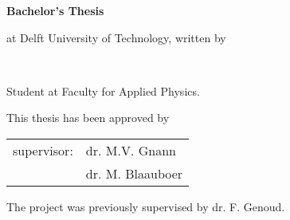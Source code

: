 \begin{titlepage}

\begin{center}


\vspace*{2\bigskipamount}

{\makeatletter
\titlestyle\bfseries\LARGE\@title
\makeatother}

{\makeatletter
\ifx\@subtitle\undefined\else
    \bigskip
    \titlefont\titleshape\Large\@subtitle
\fi
\makeatother}

\vfill

{\Large\titlefont\bfseries Bachelor's Thesis}

\bigskip
\bigskip

at Delft University of Technology, written by

\bigskip
\bigskip


\makeatletter
{\Large\titlefont\bfseries\@firstname\ {\titleshape\@lastname}}
\makeatother

\bigskip

Student at Faculty for Applied Physics.\\

\vspace*{2\bigskipamount}

\end{center}

\clearpage
\thispagestyle{empty}

\noindent This thesis has been approved by

\medskip\noindent
\begin{tabular}{p{2cm}l}
    supervisor: &dr. M.V. Gnann\\
    &dr. M. Blaauboer
\end{tabular}

\medskip
\noindent The project was previously supervised by dr. F. Genoud.

\bigskip
\bigskip


\end{titlepage}
